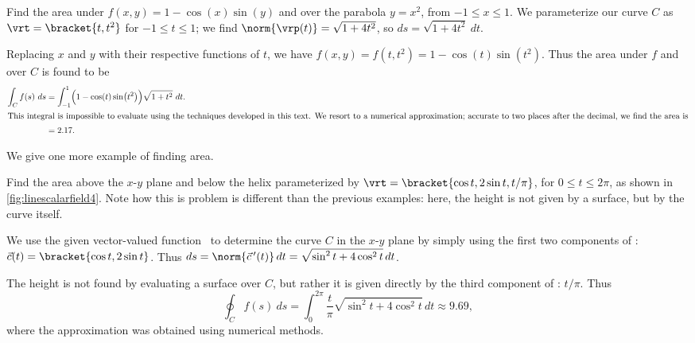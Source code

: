 \begin{example}\label{ex_linescalarfield5}
Find the area under $f(x,y) = 1-\cos(x)\sin(y)$ and over the parabola $y = x^2$, from $-1\leq x\leq 1$.
\solution
We parameterize our curve $C$ as $\vrt =\bracket{t,t^2}$ for $-1\leq t\leq 1$; we find $\norm{\vrp(t)} = \sqrt{1+4t^2}$, so $ds = \sqrt{1+4t^2}\ dt$. 

Replacing $x$ and $y$ with their respective functions of $t$, we have $f(x,y) = f(t,t^2) = 1-\cos(t)\sin(t^2)$. Thus the area under $f$ and over $C$ is found to be
\begin{align*}
	\int_C f(s)\ ds
	&= \int_{-1}^1 \Bigl(1-\cos(t)\sin\bigl(t^2\bigr)\Bigr)\sqrt{1+t^2}\ dt.\\
\intertext{This integral is impossible to evaluate using the techniques developed in this text. We resort to a numerical approximation; accurate to two places after the decimal, we find the area is}
	&= 2.17.
\end{align*}
\end{example}

We give one more example of finding area.


\begin{example}\label{ex_linescalarfield4}
Find the area above the $x$-$y$ plane and below the helix parameterized by $\vrt =\bracket{\cos t,2\sin t,t/\pi}$, for $0\leq t\leq 2\pi$, as shown in \autoref{fig:linescalarfield4}.
\solution
Note how this is problem is different than the previous examples: here, the height is not given by a surface, but by the curve itself. 

We use the given vector-valued function \vrt\ to determine the curve $C$ in the $x$-$y$ plane by simply using the first two components of \vrt: $\vec c(t) =\bracket{\cos t,2\sin t}$. Thus $ds = \norm{\vec c\,'(t)}\,dt = \sqrt{\sin^2t + 4\cos^2t}\,dt$. 

The height is not found by evaluating a surface over $C$, but rather it is given directly by the third component of \vrt: $t/\pi$. Thus
\[
\oint_C f(s)\ ds
= \int_0^{2\pi} \frac{t}{\pi}\sqrt{\sin^2t + 4\cos^2t}\,dt \approx 9.69,
\]
where the approximation was obtained using numerical methods.
\end{example}

